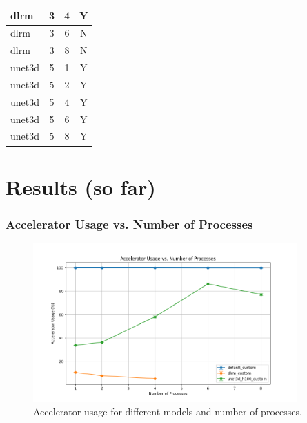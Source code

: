 \documentclass[brazil, bsc, 10pt]{beamer}
\begin{document}
\begin{frame}
\begin{table}[h!]
{\begin{tabular}{|l|c|c|c|}
				dlrm           & 3               & 4               & Y            \\ \hline
				dlrm           & 3               & 6               & N            \\ \hline
				dlrm           & 3               & 8               & N            \\ \hline
				unet3d         & 5               & 1               & Y            \\ \hline
				unet3d         & 5               & 2               & Y            \\ \hline
				unet3d         & 5               & 4               & Y            \\ \hline
				unet3d         & 5               & 6               & Y            \\ \hline
				unet3d         & 5               & 8               & Y            \\ \hline
			\end{tabular}%
		}
	\end{table}
\end{frame}

\section{Results (so far)}

\begin{frame}
	\frametitle{Accelerator Usage vs. Number of Processes}
	\begin{figure}
		\centering
		\includegraphics[width=0.9\textwidth]{images/au.png}
		\caption{Accelerator usage for different models and number of processes.}
	\end{figure}
\end{frame}
\end{document}
